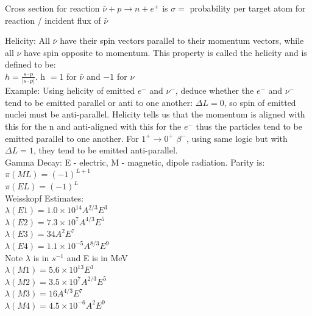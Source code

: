 \documentclass{article}
\begin{document}
\begin{multicols}{3}
Cross section for reaction $\bar{\nu} + p \rightarrow n + e^{+}$ is $\sigma =$ probability per target atom for reaction / incident flux of $\bar{\nu}$

Helicity: All $\bar{\nu}$ have their spin vectors parallel to their momentum vectors, while all $\nu$ have spin opposite to momentum.  This property is called the helicity and is defined to be:\\
\hspace*{0.01\textwidth} $h = \frac{s \cdot p}{|s \cdot p|}$.  h $= 1$ for $\bar{\nu}$ and $-1$ for $\nu$\\
\hspace*{0.01\textwidth} Example: Using helicity of emitted $e^{-}$ and $\nu^{-}$, deduce whether the $e^{-}$ and $\nu^{-}$ tend to be emitted parallel or anti to one another: $\Delta L = 0$, so spin of emitted nuclei must be anti-parallel.  Helicity tells us that the momentum is aligned with this for the n and anti-aligned with this for the $e^{-}$ thus the particles tend to be emitted parallel to one another.  For $1^{+} \rightarrow 0^{+}$ $\beta^{-}$, using same logic but with $\Delta L = 1$, they tend to be emitted anti-parallel.\\

Gamma Decay:
E - electric, M - magnetic, dipole radiation.  Parity is:\\
\hspace*{0.01\textwidth} $\pi(ML) = (-1)^{L+1}$\\
\hspace*{0.01\textwidth} $\pi(EL) = (-1)^{L}$\\
Weisskopf Estimates:\\
\hspace*{0.01\textwidth} $\lambda (E1) = 1.0 \times 10^{14} A^{2/3} E^{3}$\\
\hspace*{0.01\textwidth} $\lambda (E2) = 7.3 \times 10^{7} A^{4/3} E^{5}$\\
\hspace*{0.01\textwidth} $\lambda (E3) = 34 A^{2} E^{7}$\\
\hspace*{0.01\textwidth} $\lambda (E4) = 1.1 \times 10^{-5} A^{8/3} E^{9}$\\
Note $\lambda$ is in $s^{-1}$ and E is in MeV\\
\hspace*{0.01\textwidth} $\lambda (M1) = 5.6 \times 10^{13} E^{3}$\\
\hspace*{0.01\textwidth} $\lambda (M2) = 3.5 \times 10^{7} A^{2/3} E^{5}$\\
\hspace*{0.01\textwidth} $\lambda (M3) = 16 A^{4/3} E^{7}$\\
\hspace*{0.01\textwidth} $\lambda (M4) = 4.5 \times 10^{-6} A^{2} E^{9}$\\


\end{multicols}
\end{document}
